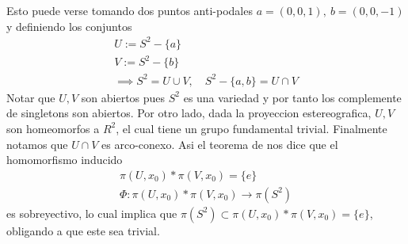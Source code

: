 \begin{ejemplo}  \label{ej:S2-simpleconexo}
  Esto puede verse tomando dos puntos anti-podales \(a = (0,0,1),\ b =
  (0,0,-1)\) y definiendo los conjuntos
  \begin{gather*}
    U := S^2 - \{a\} \\
    V := S^2 - \{b\} \\
    \implies S^2 = U \cup V, \quad S^2 - \{a,b\} = U \cap V
  \end{gather*}
  Notar que \(U,V\) son abiertos pues \(S^2\) es una variedad y por tanto
  los complemente de singletons son abiertos. Por otro lado, dada la
  proyeccion estereografica, \(U,V\) son homeomorfos a \(R^2\), el cual
  tiene un grupo fundamental trivial. Finalmente notamos que \(U \cap
  V\) es arco-conexo. Asi el teorema de \vank nos dice que el
  homomorfismo inducido
  \begin{gather*}
    \pi (U, x_0) * \pi (V, x_0) = \{e\} \\
    \Phi : \pi (U, x_0) * \pi (V, x_0) \longrightarrow \pi (S^2)
  \end{gather*}
  es sobreyectivo, lo cual implica que \(\pi (S^2) \subset \pi (U, x_0)
  * \pi (V, x_0) = \{e\}\), obligando a que este sea trivial.
\end{ejemplo}

